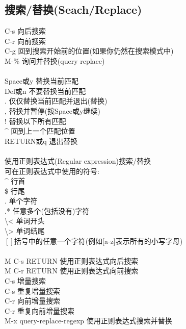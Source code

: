 \documentclass[11pt,a4paper,titlepage]{article}
\begin{document}
{\subsection{\kai 搜索/替换(Seach/Replace)}
C-s 向后搜索\\
C-r 向前搜索\\
C-g 回到搜索开始前的位置(如果你仍然在搜索模式中)\\
M-\% 询问并替换(query replace)\\
 \\
Space或y 替换当前匹配\\
Del或n 不要替换当前匹配\\
. 仅仅替换当前匹配并退出(替换)\\
, 替换并暂停(按Space或y继续)\\
! 替换以下所有匹配\\
\^{} 回到上一个匹配位置\\
RETURN或q 退出替换\\
 \\
使用正则表达式(Regular expression)搜索/替换\\
可在正则表达式中使用的符号:\\
\^{} 行首\\
\$ 行尾\\
. 单个字符\\
.* 任意多个(包括没有)字符\\
\textbackslash < 单词开头\\
\textbackslash > 单词结尾\\
$[]$括号中的任意一个字符(例如[a-z]表示所有的小写字母)\\
\\  
M C-s RETURN 使用正则表达式向后搜索\\
M C-r RETURN 使用正则表达式向前搜索\\
C-s 增量搜索\\
C-s 重复增量搜索\\
C-r 向前增量搜索\\
C-r 重复向前增量搜索\\
M-x query-replace-regexp 使用正则表达式搜索并替换\\

}
\end{document}
